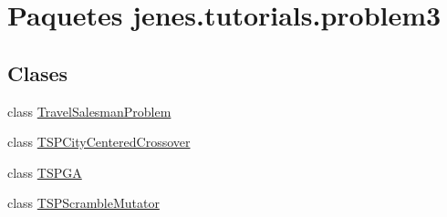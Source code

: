 \hypertarget{namespacejenes_1_1tutorials_1_1problem3}{\section{Paquetes jenes.\-tutorials.\-problem3}
\label{namespacejenes_1_1tutorials_1_1problem3}
}
\subsection*{Clases}
\begin{DoxyCompactItemize}
\item 
class \hyperlink{classjenes_1_1tutorials_1_1problem3_1_1_travel_salesman_problem}{Travel\-Salesman\-Problem}
\item 
class \hyperlink{classjenes_1_1tutorials_1_1problem3_1_1_t_s_p_city_centered_crossover}{T\-S\-P\-City\-Centered\-Crossover}
\item 
class \hyperlink{classjenes_1_1tutorials_1_1problem3_1_1_t_s_p_g_a}{T\-S\-P\-G\-A}
\item 
class \hyperlink{classjenes_1_1tutorials_1_1problem3_1_1_t_s_p_scramble_mutator}{T\-S\-P\-Scramble\-Mutator}
\end{DoxyCompactItemize}
